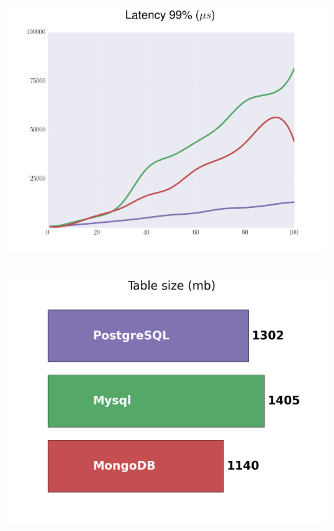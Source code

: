 \documentclass[18pt, compress, aspectratio=169]{beamer}
\begin{document}
\begin{frame}
    \frametitle{}
    \begin{center}
    \begin{figure}
        \includegraphics[width=0.75\textwidth,center]{benchmarks/workload_c_btree/latency_99.png}
    \end{figure}
    \end{center}
\end{frame}


\begin{frame}
    \frametitle{}
    \begin{center}
    \begin{figure}
        \includegraphics[width=0.75\textwidth,center]{benchmarks/table_size.png}
    \end{figure}
    \end{center}
\end{frame}
\end{document}
